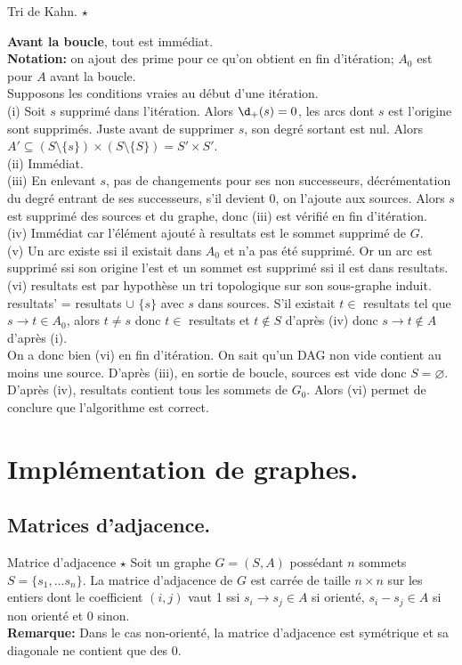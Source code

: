 \documentclass[french, 11pt]{article}
\begin{document}
\begin{prop}{Tri de Kahn. $\star$}{}
\begin{itemize}[topsep=0pt,itemsep=-0.9 ex]
    \end{itemize}\vspace{0.2cm}
    \textbf{Avant la boucle}, tout est immédiat.\\
    \textbf{Notation:} on ajout des prime pour ce qu'on obtient en fin d'itération; $A_0$ est pour $A$ avant la boucle.\\
    Supposons les conditions vraies au début d'une itération.\\
    (i) Soit $s$ supprimé dans l'itération. Alors $\d_+(s)=0$, les arcs dont $s$ est l'origine sont supprimés. Juste avant de supprimer $s$, son degré sortant est nul. Alors $A'\subseteq(S\setminus\{s\})\times(S\setminus\{S\})=S'\times S'$.\\
    (ii) Immédiat.\\
    (iii) En enlevant $s$, pas de changements pour ses non successeurs, décrémentation du degré entrant de ses successeurs, s'il devient 0, on l'ajoute aux sources. Alors $s$ est supprimé des sources et du graphe, donc (iii) est vérifié en fin d'itération.\\
    (iv) Immédiat car l'élément ajouté à resultats est le sommet supprimé de $G$.\\
    (v) Un arc existe ssi il existait dans $A_0$ et n'a pas été supprimé. Or un arc est supprimé ssi son origine l'est et un sommet est supprimé ssi il est dans resultats.\\
    (vi) resultats est par hypothèse un tri topologique sur son sous-graphe induit. resultats' = resultats $\cup$ $\{s\}$ avec $s$ dans sources. S'il existait $t\in$ resultats tel que $s\to t\in A_0$, alors $t\neq s$ donc $t\in$ resultats et $t\notin S$ d'après (iv) donc $s\to t\notin A$ d'après (i).\\
    On a donc bien (vi) en fin d'itération. On sait qu'un DAG non vide contient au moins une source. D'après (iii), en sortie de boucle, sources est vide donc $S=\varnothing$. D'après (iv), resultats contient tous les sommets de $G_0$. Alors (vi) permet de conclure que l'algorithme est correct.
\end{prop}

\section{Implémentation de graphes.}

\subsection{Matrices d'adjacence.}
\begin{defi}{Matrice d'adjacence $\star$}{}
    Soit un graphe $G=(S,A)$ possédant $n$ sommets $S=\{s_1,...s_n\}$. La matrice d'adjacence de $G$ est carrée de taille $n\times n$ sur les entiers dont le coefficient $(i,j)$ vaut 1 ssi $s_i\to s_j\in A$ si orienté, $s_i-s_j\in A$ si non orienté et 0 sinon.\\
    \textbf{Remarque:} Dans le cas non-orienté, la matrice d'adjacence est symétrique et sa diagonale ne contient que des 0.  
\end{defi}
\end{document}
